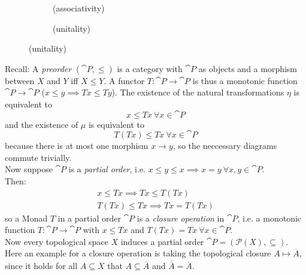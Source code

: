 \begin{definition}[Monad]
\begin{figure}[H]
\centering
\begin{subfigure}{0.4\textwidth}
\centering
\caption*{(associativity)}
\end{subfigure}
\hspace{2em}
\begin{subfigure}{0.4\textwidth}
\centering
\caption*{(unitality)}
\end{subfigure}
\end{figure}

\end{definition}

\begin{example}[preorder]
Recall: A \textit{preorder} $(\cat{P},\le)$ is a category with $\cat{P}$ as objects and 
a morphism between $X$ and $Y$ iff $X \le Y$.
A functor $T\colon \cat{P} \to \cat{P}$ is thus a monotonic function $\cat{P}\to \cat{P}$
($x \le y \implies Tx\le Ty$).
The existence of the natural transformations $\eta$ is equivalent to
\[x \le Tx \ \forall x \in \cat{P}\]
and the existence of $\mu$ is equivalent to
\[T(Tx) \le Tx \ \forall x \in \cat{P}\] 
because there is at most one morphism $x \to y$, so the neccessary diagrams commute trivially.\\
Now suppose $\cat{P}$ is a \textit{partial order}, i.e. $x \le y \le x \implies x = y \ \forall x,y \in \cat{P}$. \\
Then:
\begin{align*}
    x \le Tx \implies Tx \le T(Tx) \\
    T(Tx) \le Tx \implies Tx = T(Tx)
\end{align*}
so a Monad $T$ in a partial order $\cat{P}$ is a \textit{closure operation} in $\cat{P}$, i.e. 
a monotonic function $T \colon \cat{P} \to \cat{P}$ 
with $x \le Tx$ and $T(Tx)=Tx \ \forall x \in \cat{P}.$ \\
Now every topological space $X$ induces a partial order $\cat{P} = (\mathscr{P}(X),\subseteq)$.
Here an example for a closure operation is taking the topological closure $A \mapsto \overline{A}$,
since it holds for all $A \subseteq X$ that $A \subseteq \overline{A}$ and
$\overline{\overline{A}} = \overline{A}$.
\end{example}

